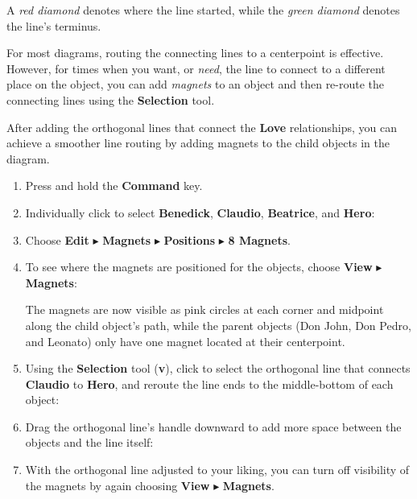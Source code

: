 \documentclass[../main.tex]{subfiles}
\begin{document}

A \textit{red diamond} denotes where the line started, while the \textit{green diamond} denotes
the line's terminus.

For most diagrams, routing the connecting lines to a centerpoint is effective. However, for
times when you want, or \textit{need}, the line to connect to a different place on the object,
you can add \textit{magnets} to an object and then re-route the connecting lines using the
\textbf{Selection} tool.

After adding the orthogonal lines that connect the \textbf{Love} relationships, you can achieve
a smoother line routing by adding magnets to the child objects in the diagram.

\begin{enumerate}
  \item Press and hold the \textbf{Command} key.
  \item Individually click to select \textbf{Benedick}, \textbf{Claudio}, \textbf{Beatrice}, and
    \textbf{Hero}:

  \item Choose \textbf{Edit} $\blacktriangleright$ \textbf{Magnets} $\blacktriangleright$
    \textbf{Positions} $\blacktriangleright$ \textbf{8 Magnets}.
  \item To see where the magnets are positioned for the objects, choose \textbf{View}
    $\blacktriangleright$ \textbf{Magnets}:


    The magnets are now visible as pink circles at each corner and midpoint along the child
    object's path, while the parent objects (Don John, Don Pedro, and Leonato) only have one
    magnet located at their centerpoint.
  \item Using the \textbf{Selection} tool (\textbf{v}), click to select the orthogonal line that
    connects \textbf{Claudio} to \textbf{Hero}, and reroute the line ends to the middle-bottom
    of each object:


  \item Drag the orthogonal line's handle downward to add more space between the objects and the
    line itself:

  \item With the orthogonal line adjusted to your liking, you can turn off visibility of the
    magnets by again choosing \textbf{View} $\blacktriangleright$ \textbf{Magnets}.
\end{enumerate}
\end{document}
